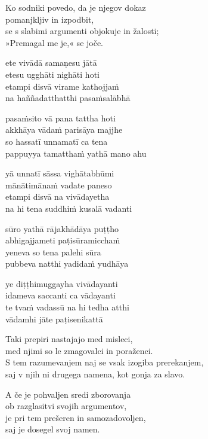 Ko sodniki povedo, da je njegov dokaz\\
pomanjkljiv in izpodbit,\\
se s slabimi argumenti objokuje in žalosti;\\
»Premagal me je,« se joče.


\clearpage

ete vivādā samaṇesu jātā\\
etesu ugghāti nighāti hoti\\
etampi disvā virame kathojjaṁ\\
na haññadatthatthi pasaṁsalābhā

pasaṁsito vā pana tattha hoti\\
akkhāya vādaṁ parisāya majjhe\\
so hassatī unnamatī ca tena\\
pappuyya tamatthaṁ yathā mano ahu

yā unnatī sāssa vighātabhūmi\\
mānātimānaṁ vadate paneso\\
etampi disvā na vivādayetha\\
na hi tena suddhiṁ kusalā vadanti

sūro yathā rājakhādāya puṭṭho\\
abhigajjameti paṭisūramicchaṁ\\
yeneva so tena palehi sūra\\
pubbeva natthi yadidaṁ yudhāya

ye diṭṭhimuggayha vivādayanti\\
idameva saccanti ca vādayanti\\
te tvaṁ vadassū na hi tedha atthi\\
vādamhi jāte paṭisenikattā


\clearpage

Taki prepiri nastajajo med misleci,\\
med njimi so le zmagovalci in poraženci.\\
S tem razumevanjem naj se vsak izogiba prerekanjem,\\
saj v njih ni drugega namena, kot gonja za slavo.

A če je pohvaljen sredi zborovanja\\
ob razglasitvi svojih argumentov,\\
je pri tem prešeren in samozadovoljen,\\
saj je dosegel svoj namen.


